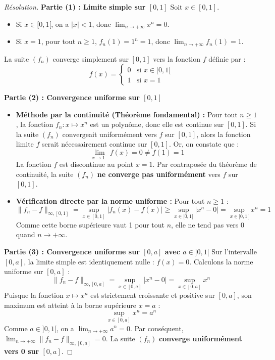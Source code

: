 \documentclass[12pt,a4paper]{report}
\begin{document}
\begin{proof}[Résolution]
\textbf{Partie (1) : Limite simple sur $[0, 1]$}
Soit $x \in [0, 1]$.
\begin{itemize}
    \item Si $x \in [0, 1[$, on a $|x| < 1$, donc $\lim_{n \to +\infty} x^n = 0$.
    \item Si $x = 1$, pour tout $n \ge 1$, $f_n(1) = 1^n = 1$, donc $\lim_{n \to +\infty} f_n(1) = 1$.
\end{itemize}
La suite $(f_n)$ converge simplement sur $[0, 1]$ vers la fonction $f$ définie par :
\[ f(x) = \begin{cases} 0 & \text{si } x \in [0, 1[ \\ 1 & \text{si } x = 1 \end{cases} \]

\textbf{Partie (2) : Convergence uniforme sur $[0, 1]$}
\begin{itemize}
    \item \textbf{Méthode par la continuité (Théorème fondamental) :}
    Pour tout $n \ge 1$, la fonction $f_n : x \mapsto x^n$ est un polynôme, donc elle est continue sur $[0, 1]$.
    Si la suite $(f_n)$ convergeait uniformément vers $f$ sur $[0, 1]$, alors la fonction limite $f$ serait nécessairement continue sur $[0, 1]$.
    Or, on constate que :
    \[ \lim_{x \to 1^-} f(x) = 0 \neq f(1) = 1 \]
    La fonction $f$ est discontinue au point $x = 1$. Par contraposée du théorème de continuité, la suite $(f_n)$ \textbf{ne converge pas uniformément} vers $f$ sur $[0, 1]$.
    \item \textbf{Vérification directe par la norme uniforme :}
    Pour tout $n \ge 1$ :
    \[ \|f_n - f\|_{\infty, [0, 1]} = \sup_{x \in [0, 1]} |f_n(x) - f(x)| \ge \sup_{x \in [0, 1[} |x^n - 0| = \sup_{x \in [0, 1[} x^n = 1 \]
    Comme cette borne supérieure vaut 1 pour tout $n$, elle ne tend pas vers 0 quand $n \to +\infty$.
\end{itemize}

\textbf{Partie (3) : Convergence uniforme sur $[0, a]$ avec $a \in ]0, 1[$}
Sur l'intervalle $[0, a]$, la limite simple est identiquement nulle : $f(x) = 0$.
Calculons la norme uniforme sur $[0, a]$ :
\[ \|f_n - f\|_{\infty, [0, a]} = \sup_{x \in [0, a]} |x^n - 0| = \sup_{x \in [0, a]} x^n \]
Puisque la fonction $x \mapsto x^n$ est strictement croissante et positive sur $[0, a]$, son maximum est atteint à la borne supérieure $x = a$ :
\[ \sup_{x \in [0, a]} x^n = a^n \]
Comme $a \in ]0, 1[$, on a $\lim_{n \to +\infty} a^n = 0$.
Par conséquent, $\lim_{n \to +\infty} \|f_n - f\|_{\infty, [0, a]} = 0$.
La suite $(f_n)$ \textbf{converge uniformément vers 0 sur $[0, a]$}.


\end{proof}
\end{document}
